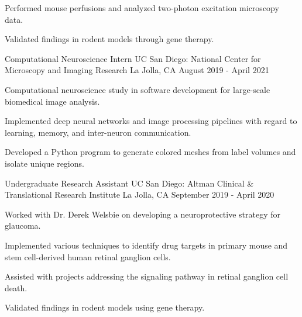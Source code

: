 \begin{cventries}
{\begin{cvitems}
    \item {Performed mouse perfusions and analyzed two-photon excitation microscopy data.}
    \item {Validated findings in rodent models through gene therapy.}
  \end{cvitems}
}
\cventry
{Computational Neuroscience Intern} %
{UC San Diego: National Center for Microscopy and Imaging Research} %
{La Jolla, CA} %
{August 2019 - April 2021} %
{
  \begin{cvitems} %
    \item {Computational neuroscience study in software development for large-scale biomedical image analysis.}
    \item {Implemented deep neural networks and image processing pipelines with regard to learning, memory, and inter-neuron communication.}
    \item {Developed a Python program to generate colored meshes from label volumes and isolate unique regions.}
  \end{cvitems}
}
  \cventry
    {Undergraduate Research Assistant} %
    {UC San Diego: Altman Clinical \& Translational Research Institute} %
    {La Jolla, CA} %
    {September 2019 - April 2020} %
    {
      \begin{cvitems} %
        \item {Worked with Dr. Derek Welsbie on developing a neuroprotective strategy for glaucoma.}
        \item {Implemented various techniques to identify drug targets in primary mouse and stem cell-derived human retinal ganglion cells.}
        \item {Assisted with projects addressing the signaling pathway in retinal ganglion cell death.}
        \item {Validated findings in rodent models using gene therapy.}
      \end{cvitems}
    }
\end{cventries}

